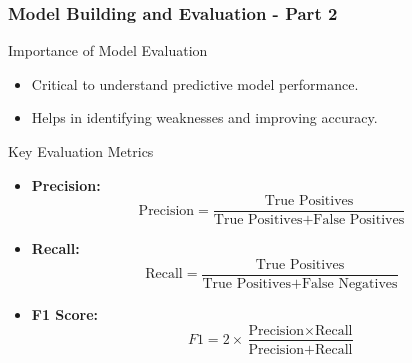 \documentclass{beamer}
\begin{document}
\begin{frame}[fragile]
    \frametitle{Model Building and Evaluation - Part 2}
    \begin{block}{Importance of Model Evaluation}
        \begin{itemize}
            \item Critical to understand predictive model performance.
            \item Helps in identifying weaknesses and improving accuracy.
        \end{itemize}
    \end{block}

    \begin{block}{Key Evaluation Metrics}
        \begin{itemize}
            \item \textbf{Precision:} 
            \begin{equation}
                \text{Precision} = \frac{\text{True Positives}}{\text{True Positives} + \text{False Positives}}
            \end{equation}
            \item \textbf{Recall:} 
            \begin{equation}
                \text{Recall} = \frac{\text{True Positives}}{\text{True Positives} + \text{False Negatives}}
            \end{equation}
            \item \textbf{F1 Score:} 
            \begin{equation}
                F1 = 2 \times \frac{\text{Precision} \times \text{Recall}}{\text{Precision} + \text{Recall}}
            \end{equation}
        \end{itemize}
    \end{block}
\end{frame}
\end{document}
